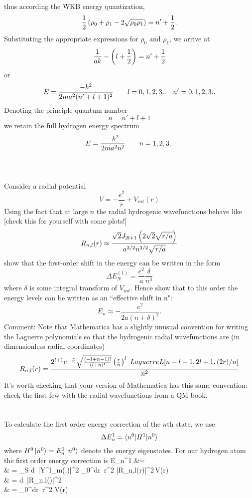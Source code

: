 \documentclass[10pt,letterpaper]{article}
\begin{document}
		thus according the WKB energy quantization,
		\[
			\frac{1}{2}\left(\rho_0+\rho_1-2\sqrt{\rho_0\rho_1}\right) = n'+\frac{1}{2}.
		\]
		Substituting the appropriate expressions for $\rho_0$ and $\rho_1$, we arrive at
		\[
			\frac{1}{ak}- \left(l+\frac{1}{2}\right)= n'+\frac{1}{2}
		\]
		or
		\[
			E=\frac{-\hbar^2}{2ma^2(n'+l+1)^2} \qquad l=0,1,2,3..\quad n'=0,1,2,3..
		\]
		Denoting the principle quantum number
		\[
			n = n'+l+1
		\]
		we retain the full hydrogen energy spectrum
		\[
			E=\frac{-\hbar^2}{2ma^2n^2} \qquad n=1,2,3..
		\]
		\\
		\\
		\item
		Consider a radial potential 
		\[
			V = -\frac{e^2}{r}+V_{int}(r)
		\]
		Using the fact that at large $n$ the radial hydrogenic wavefunctions behave like [check this for yourself with some plots!]
		\[
			R_{n,l}(r) \approx \frac{\sqrt 2J_{2l+1}\left(2\sqrt 2\sqrt{r/a}\right)}{a^{3/2}n^{3/2}\sqrt{r/a}}
		\]
		show that the first-order shift in the energy can be written in the form
		\[
			\Delta E_N^{(1)}=\frac{e^2}{a}\frac{\delta}{n^3}
		\]
		where $\delta$ is some integral transform of $V_{int}$. Hence show that to this order the energy levels can be
		written as an ``effective shift in n":
		\[
			E_n\approx -\frac{e^2}{2a(n+\delta)^2}. 
		\]
		Comment: Note that Mathematica has a slightly unusual convention for writing the Laguerre polynomials so that the
		hydrogenic radial wavefunctions are (in dimensionless radial coordinates)
		\[
			R_{n,l}(r) = \frac{2^{l+1}e^{-\frac{r}{n}}\sqrt{\frac{(-l+n-1)!}{(l+n)!}}\pfrac{r}{n}^l\ LaguerreL[n-l-1,2l+1,(2r)/n]}{n^2}
		\]
		It's worth checking that your version of Mathematica has this same convention: check the first few with the radial 
		wavefunctions from a QM book. 
		\\
		\\
		\\
		To calculate the first order energy correction of the $n$th state, we use
		\[
			\Delta E_n^1 = \braket{n^0|H^1|n^0}
		\]
		where $H^0\ket{n^0} = E_n^0\ket{n^0}$ denote the energy eigenstates. For our hydrogen atom the first 
		order energy correction is
		\ba
			\Delta E_n^1 &=  \\
			& = \int_S d\Omega\ |Y^l_m(\theta,\phi)|^2  \int_0^\infty dr\ r^2 |R_{n,l}(r)|^2\,V(r) \\
			& = \int d\rho\ |R_{n,l}(\rho)|^2 \\
			& = \int_0^\infty dr\ r^2 V(r)\\
\end{document}
